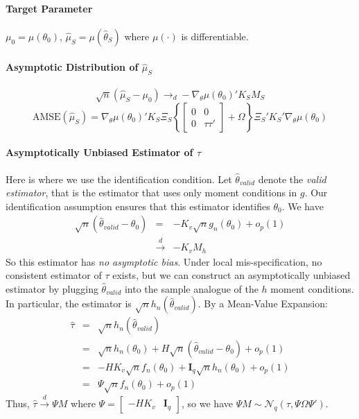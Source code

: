 \documentclass[12pt]{article}
\theoremstyle{definition}
\begin{document}
\paragraph{Target Parameter} $\mu_0 = \mu(\theta_0)$, $\widehat{\mu}_S = \mu(\widehat{\theta}_S)$ where $\mu(\cdot)$ is differentiable.

\paragraph{Asymptotic Distribution of $\widehat{\mu}_S$} 
$$\sqrt{n}\left(\widehat{\mu}_S - \mu_0\right)\rightarrow_d-\nabla_\theta\mu(\theta_0)'K_S M_S$$
$$\mbox{AMSE}\left(\widehat{\mu}_S\right) = \nabla_\theta\mu(\theta_0)'K_S \Xi_S \left\{\left[\begin{array}{cc}0&0\\0&\tau\tau'\end{array}\right] + \Omega\right\}\Xi_S'K_S'\nabla_\theta\mu(\theta_0)$$

\paragraph{Asymptotically Unbiased Estimator of $\tau$} Here is where we use the identification condition. Let $\widehat{\theta}_{valid}$ denote the \emph{valid estimator}, that is the estimator that uses only moment conditions in $g$. Our identification assumption ensures that this estimator identifies $\theta_0$. We have
\begin{eqnarray*}
	\sqrt{n}\left(\widehat{\theta}_{valid} - \theta_0 \right) &=&  -K_v \sqrt{n}g_n(\theta_0) + o_p(1)\\
	&\overset{d}{\rightarrow}& -K_v M_h
\end{eqnarray*}
So this estimator has \emph{no asymptotic bias}. Under local mis-specification, no consistent estimator of $\tau$ exists, but we can construct an asymptotically unbiased estimator by plugging $\widehat{\theta}_{valid}$ into the sample analogue of the $h$ moment conditions. In particular, the estimator is $\sqrt{n} h_n\left(\widehat{\theta}_{valid}\right)$. By a Mean-Value Expansion:
\begin{eqnarray*}
	\widehat{\tau} &=& \sqrt{n} h_n\left(\widehat{\theta}_{valid}\right)\\
	& =& \sqrt{n}h_n(\theta_0) + H \sqrt{n}\left(\widehat{\theta}_{valid} - \theta_0\right) + o_p(1)\\
		&=&-HK_{v} \sqrt{n}f_n(\theta_0) + \mathbf{I}_q\sqrt{n}h_n(\theta_0) +o_p(1)\\
		&=& \Psi \sqrt{n}f_n(\theta_0) + o_p(1)
\end{eqnarray*}
Thus, $\widehat{\tau}\overset{d}{\rightarrow}\Psi M$ where $\Psi = \left[\begin{array}{cc} -HK_v & \mathbf{I}_q \end{array}\right]$, so we have $\Psi M \sim \mathcal{N}_q(\tau, \Psi \Omega \Psi')$.
\end{document}
